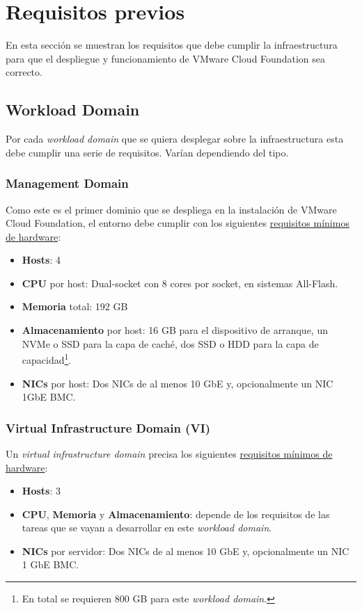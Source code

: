 \section{Requisitos previos}
En esta sección se muestran los requisitos que debe cumplir la infraestructura para que el despliegue y funcionamiento de VMware Cloud Foundation sea correcto.

\subsection{Workload Domain}
Por cada \textit{workload domain} que se quiera desplegar sobre la infraestructura esta debe cumplir una serie de requisitos. Varían dependiendo del tipo.
\subsubsection{Management Domain}
Como este es el primer dominio que se despliega en la instalación de VMware Cloud Foundation, el entorno debe cumplir con los siguientes \underline{requisitos mínimos de hardware}:
\begin{itemize}
    \item \textbf{Hosts}: 4
    \item \textbf{CPU} por host: Dual-socket con 8 cores por socket, en sistemas All-Flash.
    \item \textbf{Memoria} total: 192 GB
    \item \textbf{Almacenamiento} por host: 16 GB para el dispositivo de arranque, un NVMe o SSD para la capa de caché, dos SSD o HDD para la capa de capacidad\footnote{En total se requieren 800 GB para este \textit{workload domain}.}.
    \item \textbf{NICs} por host: Dos NICs de al menos 10 GbE y, opcionalmente un NIC 1GbE BMC.
\end{itemize}

\subsubsection{Virtual Infrastructure Domain (VI)}
Un \textit{virtual infrastructure domain} precisa los siguientes \underline{requisitos mínimos de hardware}:
\begin{itemize}
    \item \textbf{Hosts}: 3
    \item \textbf{CPU}, \textbf{Memoria} y \textbf{Almacenamiento}: depende de los requisitos de las tareas que se vayan a desarrollar en este \textit{workload domain}.
    \item \textbf{NICs} por servidor: Dos NICs de al menos 10 GbE y, opcionalmente un NIC 1 GbE BMC.
\end{itemize}

